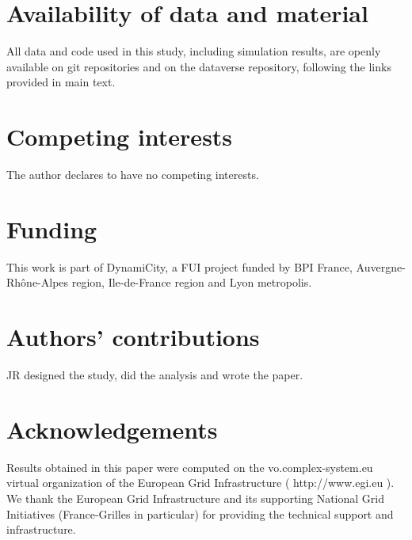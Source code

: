\documentclass{bmcart}
\begin{document}
\begin{backmatter}

\section*{Availability of data and material}

All data and code used in this study, including simulation results, are openly available on git repositories and on the dataverse repository, following the links provided in main text.

\section*{Competing interests}
  The author declares to have no competing interests.

\section*{Funding}

This work is part of DynamiCity, a FUI project funded by BPI France, Auvergne-Rh{\^o}ne-Alpes region, Ile-de-France region and Lyon metropolis.

\section*{Authors' contributions}

JR designed the study, did the analysis and wrote the paper.

\section*{Acknowledgements}

Results obtained in this paper were computed on the vo.complex-system.eu virtual organization of the European Grid Infrastructure ( http://www.egi.eu ). We thank the European Grid Infrastructure and its supporting National Grid Initiatives (France-Grilles in particular) for providing the technical support and infrastructure.


  
  




\end{backmatter}
\end{document}
